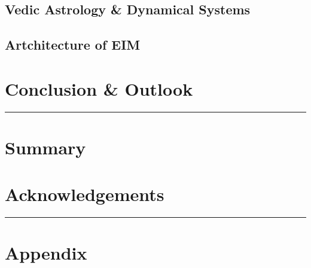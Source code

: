 \documentclass[12pt, a4paper]{article}
\begin{document}
\begin{multicols}{2}
		\subsection{Vedic Astrology \& Dynamical Systems}
		
		\subsection{Artchitecture of EIM}
		
		\section{Conclusion \& Outlook}
		
	\end{multicols}
	\hrule
	\centering
	\section*{Summary}
	
	\section*{Acknowledgements}
	
	\newline
	\hrule
	
	
	\appendix
	\section*{Appendix}
	
\end{document}

